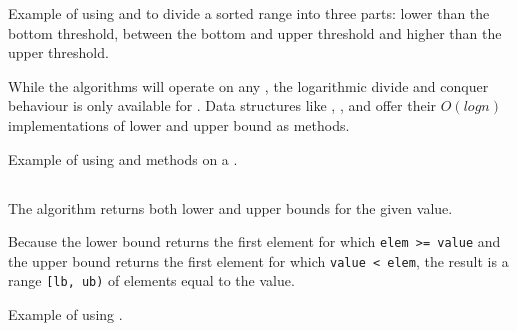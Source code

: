 \begin{box-note}
\footnotesize Example of using  and  to divide a sorted range into three parts: lower than the bottom threshold, between the bottom and upper threshold and higher than the upper threshold.
\tcblower
{}
\end{box-note}

While the algorithms will operate on any , the logarithmic divide and conquer behaviour is only available for . Data structures like , ,  and  offer their $O(logn)$ implementations of lower and upper bound as methods.

\begin{box-note}
\footnotesize Example of using  and  methods on a .
\tcblower
{}
\end{box-note}

\subsection{\texorpdfstring{}{\texttt{std::equal\_range}}}

The  algorithm returns both lower and upper bounds for the given value.


Because the lower bound returns the first element for which \texttt{elem >= value} and the upper bound returns the first element for which \texttt{value < elem}, the result is a range \texttt{[lb, ub)} of elements equal to the value.

\begin{box-note}
\footnotesize Example of using .
\tcblower
{}
\end{box-note}

\subsection{\texorpdfstring{}{\texttt{std::partition\_point}}}

